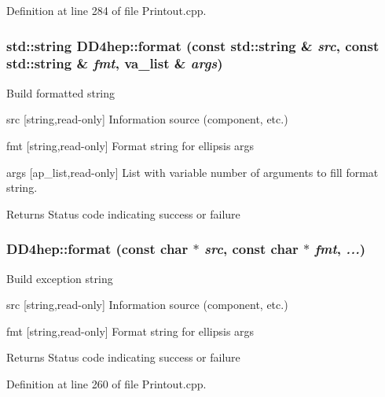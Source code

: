 Definition at line 284 of file Printout.cpp.\hypertarget{namespace_d_d4hep_a960e10fa425f33d67d2963b22f76f24a}{
\subsubsection[{format}]{\setlength{\rightskip}{0pt plus 5cm}std::string DD4hep::format (const std::string \& {\em src}, \/  const std::string \& {\em fmt}, \/  va\_\-list \& {\em args})}}
\label{namespace_d_d4hep_a960e10fa425f33d67d2963b22f76f24a}
Build formatted string \begin{DoxyItemize}
\item src \mbox{[}string,read-\/only\mbox{]} Information source (component, etc.) \item fmt \mbox{[}string,read-\/only\mbox{]} Format string for ellipsis args \item args \mbox{[}ap\_\-list,read-\/only\mbox{]} List with variable number of arguments to fill format string. \begin{DoxyReturn}{Returns}
Status code indicating success or failure 
\end{DoxyReturn}
\end{DoxyItemize}
\hypertarget{namespace_d_d4hep_a6d0802d60cd32a48326f689ffedd4dfb}{
\subsubsection[{format}]{ DD4hep::format (const char $\ast$ {\em src}, \/  const char $\ast$ {\em fmt}, \/   {\em ...})}}
\label{namespace_d_d4hep_a6d0802d60cd32a48326f689ffedd4dfb}
Build exception string \begin{DoxyItemize}
\item src \mbox{[}string,read-\/only\mbox{]} Information source (component, etc.) \item fmt \mbox{[}string,read-\/only\mbox{]} Format string for ellipsis args \begin{DoxyReturn}{Returns}
Status code indicating success or failure 
\end{DoxyReturn}
\end{DoxyItemize}


Definition at line 260 of file Printout.cpp.

